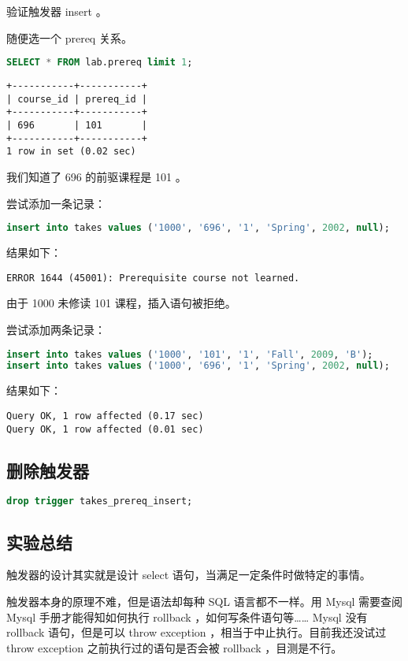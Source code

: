 \documentclass{article}
\begin{document}
验证触发器 insert 。

随便选一个 prereq 关系。

\begin{lstlisting}[language=sql]
SELECT * FROM lab.prereq limit 1;
\end{lstlisting}

\begin{lstlisting}
+-----------+-----------+
| course_id | prereq_id |
+-----------+-----------+
| 696       | 101       |
+-----------+-----------+
1 row in set (0.02 sec)
\end{lstlisting}

我们知道了 696 的前驱课程是 101 。

尝试添加一条记录：

\begin{lstlisting}[language=sql]
insert into takes values ('1000', '696', '1', 'Spring', 2002, null);
\end{lstlisting}

结果如下：

\begin{lstlisting}
ERROR 1644 (45001): Prerequisite course not learned.
\end{lstlisting}

由于 1000 未修读 101 课程，插入语句被拒绝。

尝试添加两条记录：

\begin{lstlisting}[language=sql]
insert into takes values ('1000', '101', '1', 'Fall', 2009, 'B');
insert into takes values ('1000', '696', '1', 'Spring', 2002, null);
\end{lstlisting}

结果如下：

\begin{lstlisting}
Query OK, 1 row affected (0.17 sec)
Query OK, 1 row affected (0.01 sec)
\end{lstlisting}

\subsection{删除触发器}

\begin{lstlisting}[language=sql]
drop trigger takes_prereq_insert;
\end{lstlisting}

\subsection{实验总结}

触发器的设计其实就是设计 select 语句，当满足一定条件时做特定的事情。

触发器本身的原理不难，但是语法却每种 SQL 语言都不一样。用 Mysql 需要查阅 Mysql 手册才能得知如何执行 rollback ，如何写条件语句等…… Mysql 没有 rollback 语句，但是可以 throw exception ，相当于中止执行。目前我还没试过 throw exception 之前执行过的语句是否会被 rollback ，目测是不行。
\end{document}
